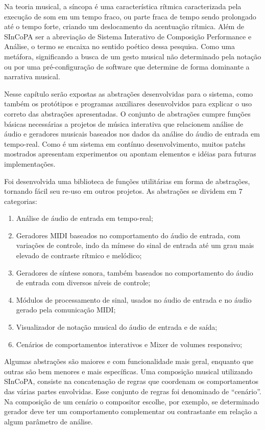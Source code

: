 \documentclass{ppgmus}
\begin{document}
Na teoria musical, a síncopa é uma característica rítmica caracterizada pela execução de som em um tempo fraco, 
ou parte fraca de tempo sendo prolongado até o tempo forte, criando um deslocamento da acentuação rítmica. 
Além de SInCoPA ser a abreviação de Sistema Interativo de Composição Performance e Análise, o termo se encaixa
no sentido poético dessa pesquisa. Como uma metáfora, significando a busca de um gesto musical não determinado pela notação
ou por uma pré-configuração de software que determine de forma dominante a narrativa musical.

  Nesse capítulo serão expostas as abstrações desenvolvidas para o sistema, como também
os protótipos e programas auxiliares desenvolvidos para explicar o uso correto das 
abstrações apresentadas. O conjunto de abstrações cumpre funções básicas necessárias
a projetos de música interativa que relacionem análise de áudio e geradores musicais
baseados nos dados da análise do áudio de entrada em tempo-real. Como é um sistema 
em contínuo desenvolvimento, muitos patchs mostrados apresentam experimentos ou apontam
elementos e idéias para futuras implementações.

  Foi desenvolvida uma biblioteca de funções utilitárias em forma de abstrações, 
tornando fácil seu re-uso em outros projetos. As abstrações se dividem em 7 categorias:

\begin{enumerate}
 \item Análise de áudio de entrada em tempo-real;
 \item Geradores MIDI baseados no comportamento do áudio de 
entrada, com variações de controle, indo da mímese do sinal de entrada
até um grau mais elevado de contraste rítmico e melódico;
 \item Geradores de síntese sonora, também baseados no comportamento
do áudio de entrada com diversos níveis de controle;
 \item Módulos de processamento de sinal, usados no áudio de entrada e no
áudio gerado pela comunicação MIDI;
 \item Visualizador de notação musical do áudio de entrada e de saída;
 \item Cenários de comportamentos interativos e Mixer de volumes responsivo;
 
\end{enumerate}

Algumas abstrações são maiores e com funcionalidade mais geral, enquanto
que outras são bem menores e mais específicas.
Uma composição musical utilizando SInCoPA, consiste na concatenação de
regras que coordenam os comportamentos das várias partes envolvidas.
Esse conjunto de regras foi denominado de ``cenário''. Na composição
de um cenário o compositor escolhe, por exemplo,  se determinado gerador 
deve ter um comportamento complementar ou contrastante  em relação a algum
parâmetro de análise.
\end{document}
